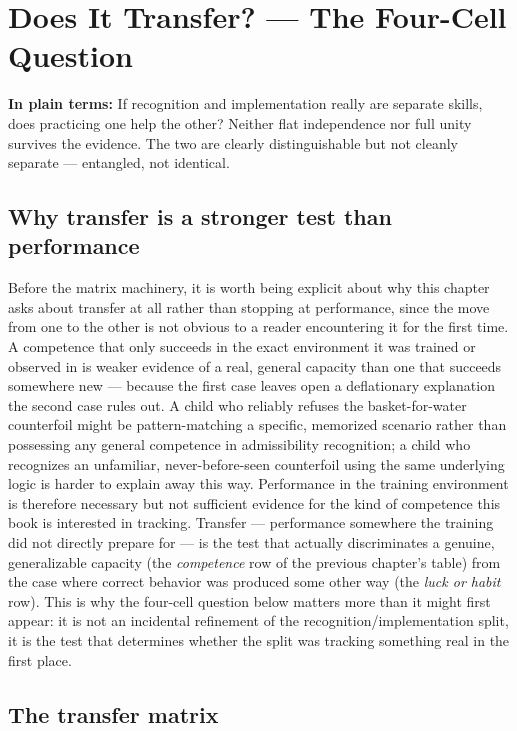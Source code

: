 \chapter{Does It Transfer? --- The Four-Cell Question}
\label{ch:transfer}

\begin{plainlanguage}
\textbf{In plain terms:} If recognition and implementation really are separate skills, does practicing one help the other? Neither flat independence nor full unity survives the evidence. The two are clearly distinguishable but not cleanly separate — entangled, not identical.
\end{plainlanguage}

\section{Why transfer is a stronger test than performance}

Before the matrix machinery, it is worth being explicit about why this chapter asks about transfer at all rather than stopping at performance, since the move from one to the other is not obvious to a reader encountering it for the first time. A competence that only succeeds in the exact environment it was trained or observed in is weaker evidence of a real, general capacity than one that succeeds somewhere new --- because the first case leaves open a deflationary explanation the second case rules out. A child who reliably refuses the basket-for-water counterfoil might be pattern-matching a specific, memorized scenario rather than possessing any general competence in admissibility recognition; a child who recognizes an unfamiliar, never-before-seen counterfoil using the same underlying logic is harder to explain away this way. Performance in the training environment is therefore necessary but not sufficient evidence for the kind of competence this book is interested in tracking. Transfer --- performance somewhere the training did not directly prepare for --- is the test that actually discriminates a genuine, generalizable capacity (the \emph{competence} row of the previous chapter's table) from the case where correct behavior was produced some other way (the \emph{luck or habit} row). This is why the four-cell question below matters more than it might first appear: it is not an incidental refinement of the recognition/implementation split, it is the test that determines whether the split was tracking something real in the first place.

\section{The transfer matrix}

